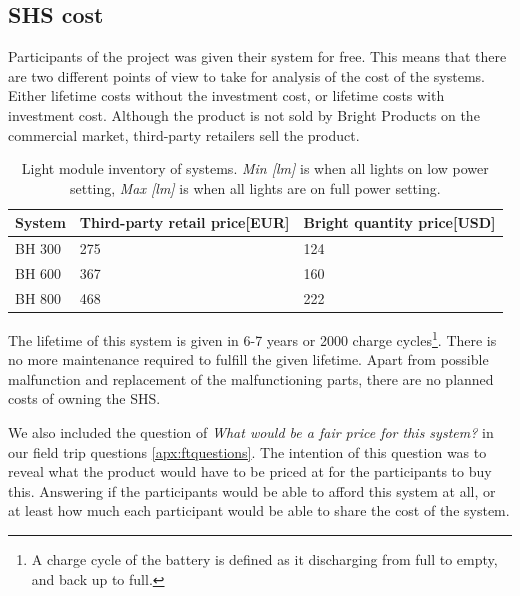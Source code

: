\subsection{SHS cost}
Participants of the project was given their system for free. This means that there are two different points of view to take for analysis of the cost of the systems. Either lifetime costs without the investment cost, or lifetime costs with investment cost. Although the product is not sold by Bright Products on the commercial market, third-party retailers sell the product. 

\begin{table}[h]
\centering
\begin{tabularx}{\textwidth}{|X|X|X|}
\hline
\textbf{System} & \textbf{Third-party retail price[EUR]} & \textbf{Bright quantity price[USD]} \\ \hline
BH 300        &  275 & 124 \\ \hline
BH 600        &  367 & 160 \\ \hline
BH 800        &  468 & 222 \\ \hline
\end{tabularx}
\caption{Light module inventory of systems. \textit{Min [lm]} is when all lights on low power setting, \textit{Max [lm]} is when all lights are on full power setting.}
\label{table:SHS_cost}
\end{table}

The lifetime of this system is given in 6-7 years or 2000 charge cycles\footnote{A charge cycle of the battery is defined as it discharging from full to empty, and back up to full.}. There is no more maintenance required to fulfill the given lifetime. Apart from possible malfunction and replacement of the malfunctioning parts, there are no planned costs of owning the SHS.

We also included the question of \textit{What would be a fair price for this system?} in our field trip questions \ref{apx:ftquestions}. The intention of this question was to reveal what the product would have to be priced at for the participants to buy this. Answering if the participants would be able to afford this system at all, or at least how much each participant would be able to share the cost of the system.


